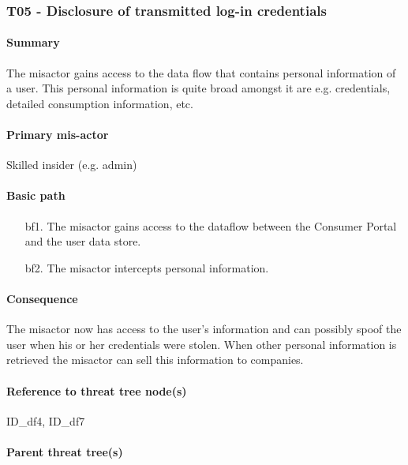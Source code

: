 \subsubsection{T05 - Disclosure of transmitted log-in credentials}
\label{threats:t05}

\paragraph{Summary}

\npar The misactor gains access to the data flow that contains personal
information of a user. This personal information is quite broad amongst it are
e.g. credentials, detailed consumption information, etc.

\paragraph{Primary mis-actor}

\npar Skilled insider (e.g. admin)

\paragraph{Basic path}
\begin{enumerate}
	\item[bf1.] The misactor gains access to the dataflow between the Consumer
	Portal and the user data store.
    \item[bf2.] The misactor intercepts personal information.
\end{enumerate}

\paragraph{Consequence}

\npar The misactor now has access to the user's information and can possibly
spoof the user when his or her credentials were stolen. When other personal
information is retrieved the misactor can sell this information to companies.

\paragraph{Reference to threat tree node(s)}

ID\_df4, ID\_df7

\paragraph{Parent threat tree(s)}

